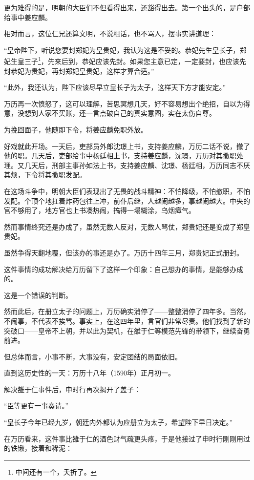 \begin{multicols}{\theparacolNo}
		更为难得的是，明朝的大臣们不但看得出来，还豁得出去。第一个出头的，是户部给事中姜应麟。

		相对而言，这位仁兄还算文明，不说粗话，也不骂人，摆事实讲道理：

		“皇帝陛下，听说您要封郑妃为皇贵妃，我认为这是不妥的。恭妃先生皇长子，郑妃生皇三子\footnote{中间还有一个，夭折了。}，先来后到，恭妃应该先封。如果您主意已定，一定要封，也应该先封恭妃为贵妃，再封郑妃皇贵妃，这样才算合适。”

		“此外，我还认为，陛下应该尽早立皇长子为太子，这样天下方才能安定。”

		万历再一次愤怒了，这可以理解，苦思冥想几天，好不容易想出个绝招，自以为得意，没想到人家不买账，还一言点破自己的真实意图，实在太伤自尊。

		为挽回面子，他随即下令，将姜应麟免职外放。

		好戏就此开场。一天后，吏部员外郎沈璟上书，支持姜应麟，万历二话不说，撤了他的职。几天后，吏部给事中杨廷相上书，支持姜应麟，沈璟，万历对其撤职处理。又几天后，刑部主事孙如法上书，支持姜应麟、沈璟、杨廷相，万历同志不厌其烦，下令将其撤职发配。

		在这场斗争中，明朝大臣们表现出了无畏的战斗精神：不怕降级，不怕撤职，不怕发配。个顶个地扛着炸药包往上冲，前仆后继，人越闹越多，事越闹越大。中央的官不够用了，地方官也上书凑热闹，搞得一塌糊涂，乌烟瘴气。

		然而事情终究还是办成了，虽然无数人反对，无数人骂仗，郑贵妃还是变成了郑皇贵妃。

		虽然争得天翻地覆，但该办的事还是办了。万历十四年三月，郑贵妃正式册封。

		这件事情的成功解决给万历留下了这样一个印象：自己想办的事情，是能够办成的。

		这是一个错误的判断。

		然而此后，在册立太子的问题上，万历确实消停了——整整消停了四年多。当然，不闹事，不代表不挨骂。事实上，在这四年里，言官们非常尽责。他们找到了新的突破口——皇帝不上朝，并以此为契机，在雒于仁等模范先锋的带领下，继续奋勇前进。

		但总体而言，小事不断，大事没有，安定团结的局面依旧。

		直到这历史性的一天：万历十八年（1590年）正月初一。

		解决雒于仁事件后，申时行再次揭开了盖子：

		“臣等更有一事奏请。”

		“皇长子今年已经九岁，朝廷内外都认为应册立为太子，希望陛下早日决定。”

		在万历看来，这件事比雒于仁的酒色财气疏更头疼，于是他接过了申时行刚刚用过的铁锹，接着和稀泥：


\end{multicols}
